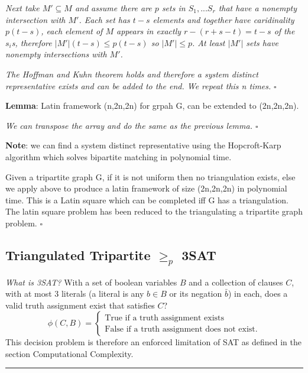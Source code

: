 \documentclass[a4paper,11pt]{report}
\newcounter{col}
\begin{document}
\textit{Next take $M'\subseteq M$ and assume there are $p$ sets in $S_1,...S_r$ that have a nonempty intersection with $M'$. Each set has $t-s$ elements and together have caridinality $p(t-s)$, each element of $M$ appears in exactly $r-(r+s-t)=t-s$ of the $s_i$s, therefore $|M'|(t-s)\leq p(t-s)$ so $|M'|\leq p$. At least $|M'|$ sets have nonempty intersections with $M'$.}

\textit{The Hoffman and Kuhn theorem holds and therefore a system distinct representative exists and can be added to the end. We repeat this n times.} $\square$

\textbf{Lemma}: Latin framework (n,2n,2n) for grpah G, can be extended to (2n,2n,2n).

\textit{We can transpose the array and do the same as the previous lemma. $\square$}

\textbf{Note}: we can find a system distinct representative using the Hopcroft-Karp \cite{hopcroft} algorithm which solves bipartite matching in polynomial time. 

Given a tripartite graph G, if it is not uniform then no triangulation exists, else we apply above to produce a latin framework of size (2n,2n,2n) in polynomial time. This is a Latin square which can be completed iff G has a triangulation. The latin square problem has been reduced to the triangulating a tripartite graph problem. $\square$




\subsection{Triangulated Tripartite $\geq_p$ 3SAT}

\textit{What is 3SAT?} With a set of boolean variables $B$ and a collection of clauses $C$, with at most 3 literals (a literal is any $b \in B$ or its negation $\bar{b}$) in each, does a valid truth assignment exist that satisfies $C$?
		\begin{equation}
		        \phi (C,B) = \begin{cases}
		            \text{True if a truth assignment exists} \\
		            \text{False if a truth assignment does not exist}.
				\end{cases}
		\end{equation}
This decision problem is therefore an enforced limitation of SAT as defined in the section Computational Complexity.

\noindent\rule{4cm}{0.4pt}
\end{document}

